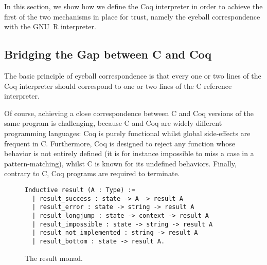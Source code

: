 \documentclass[
    sigplan,
    10pt,
    review, %
    natbib=false %
 ]{acmart}
\begin{document}
In this section, we show how we define the Coq interpreter in order to achieve the first of the two mechanisms in place for trust, namely the eyeball correspondence with the GNU~R interpreter.

\subsection{Bridging the Gap between C and Coq}
\label{sec:monad}

The basic principle of eyeball correspondence is that every one or two lines of the Coq interpreter should correspond to one or two lines of the C reference interpreter.

Of course, achieving a close correspondence between C and Coq versions of the same program is challenging, because C and Coq are widely different programming languages:
Coq is purely functional
whilst global side-effects are frequent in C.
Furthermore, Coq is designed to reject any function
whose behavior is not entirely defined
(it is for instance impossible to miss a case in a pattern-matching),
whilst C is known for its undefined behaviors.
Finally, contrary to C,
Coq programs are required to terminate.


\begin{figure}[t]
\begin{verbatim}
Inductive result (A : Type) :=
  | result_success : state -> A -> result A
  | result_error : state -> string -> result A
  | result_longjump : state -> context -> result A
  | result_impossible : state -> string -> result A
  | result_not_implemented : string -> result A
  | result_bottom : state -> result A.
\end{verbatim}
\caption{The result monad.}
\label{fig:result}
\end{figure}
\end{document}
